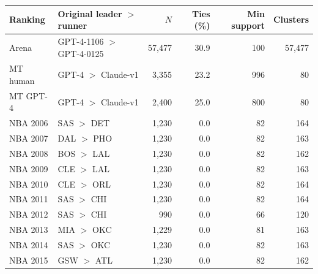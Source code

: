 \begin{tabular}{llrrrr}
\toprule
Ranking & Original leader $>$ runner & $N$ & Ties (\%) & Min support & Clusters \\
\midrule
Arena & GPT-4-1106 $>$ GPT-4-0125 & 57,477 & 30.9 & 100 & 57,477 \\
MT human & GPT-4 $>$ Claude-v1 & 3,355 & 23.2 & 996 & 80 \\
MT GPT-4 & GPT-4 $>$ Claude-v1 & 2,400 & 25.0 & 800 & 80 \\
NBA 2006 & SAS $>$ DET & 1,230 & 0.0 & 82 & 164 \\
NBA 2007 & DAL $>$ PHO & 1,230 & 0.0 & 82 & 163 \\
NBA 2008 & BOS $>$ LAL & 1,230 & 0.0 & 82 & 162 \\
NBA 2009 & CLE $>$ LAL & 1,230 & 0.0 & 82 & 163 \\
NBA 2010 & CLE $>$ ORL & 1,230 & 0.0 & 82 & 164 \\
NBA 2011 & SAS $>$ CHI & 1,230 & 0.0 & 82 & 164 \\
NBA 2012 & SAS $>$ CHI & 990 & 0.0 & 66 & 120 \\
NBA 2013 & MIA $>$ OKC & 1,229 & 0.0 & 81 & 163 \\
NBA 2014 & SAS $>$ OKC & 1,230 & 0.0 & 82 & 163 \\
NBA 2015 & GSW $>$ ATL & 1,230 & 0.0 & 82 & 162 \\
\bottomrule
\end{tabular}
